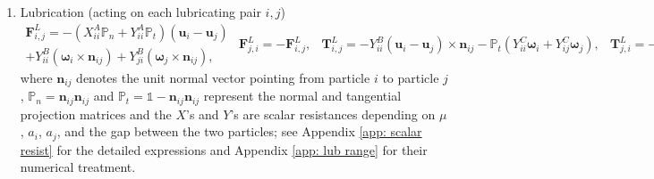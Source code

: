\begin{enumerate}
\item Lubrication (acting on each lubricating pair $i,j$)
  \begin{subequations}
    \begin{equation} 
      \begin{aligned}
        {\bm F}^L_{i,j} = -(X_{ii}^A \mathbb{P}_n + Y_{ii}^A \mathbb{P}_t)({\bm u}_i-{\bm u}_j) \\
        + Y_{ii}^B ({\bm \omega}_i \times {\bm n}_{ij}) 
        + Y_{ji}^B ({\bm \omega}_j \times {\bm n}_{ij}),
      \end{aligned}
      \label{lub F}
    \end{equation}
    \begin{equation} 
      \begin{aligned}
        {\bm F}^L_{j,i} = -{\bm F}^L_{i,j},
      \end{aligned}
      \label{lub F 2}
    \end{equation}
    \begin{equation} 
      \begin{aligned}
        {\bm T}^L_{i,j} = -Y_{ii}^B({\bm u}_i-{\bm u}_j) \times {\bm n}_{ij} 
        - \mathbb{P}_t(Y_{ii}^C{\bm \omega}_i + Y_{ij}^C{\bm \omega}_j),
      \end{aligned}
      \label{lub T}
    \end{equation}
    \begin{equation} 
      \begin{aligned}
        {\bm T}^L_{j,i} = -Y_{ji}^B({\bm u}_i-{\bm u}_j) \times {\bm n}_{ij} 
        - \mathbb{P}_t(Y_{ji}^C{\bm \omega}_i + Y_{jj}^C{\bm \omega}_j),
      \end{aligned}
      \label{lub T 2}
    \end{equation}
  \end{subequations}
  where ${\bm n}_{ij}$ denotes the unit normal vector pointing from particle $i$ to particle $j$, $\mathbb{P}_n={\bm n}_{ij}{\bm n}_{ij}$ and $\mathbb{P}_t=\mathbb{1}-{\bm n}_{ij}{\bm n}_{ij}$ represent the normal and tangential projection matrices and the $X$'s and $Y$'s are scalar resistances depending on $\mu$, $a_i$, $a_j$, and the gap between the two particles; see Appendix \ref{app: scalar resist} for the detailed expressions and Appendix \ref{app: lub range} for their numerical treatment. 


\end{enumerate}
